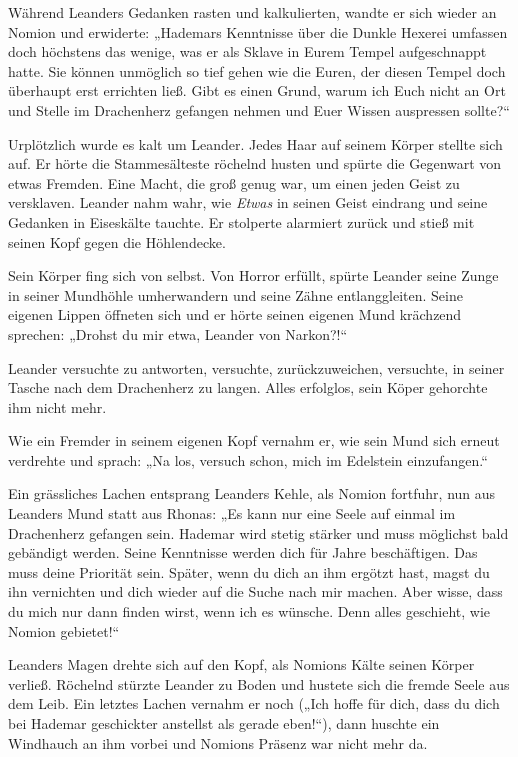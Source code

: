 \documentclass[10pt, a4paper, oneside]{book}
\begin{document}
Während Leanders Gedanken rasten und kalkulierten, wandte er sich wieder an Nomion und erwiderte: „Hademars Kenntnisse über die Dunkle Hexerei umfassen doch höchstens das wenige, was er als Sklave in Eurem Tempel aufgeschnappt hatte. Sie können unmöglich so tief gehen wie die Euren, der diesen Tempel doch überhaupt erst errichten ließ. Gibt es einen Grund, warum ich Euch nicht an Ort und Stelle im Drachenherz gefangen nehmen und Euer Wissen auspressen sollte?“

Urplötzlich wurde es kalt um Leander. Jedes Haar auf seinem Körper stellte sich auf. Er hörte die Stammesälteste röchelnd husten und spürte die Gegenwart von etwas Fremden. Eine Macht, die groß genug war, um einen jeden Geist zu versklaven. Leander nahm wahr, wie \textit{Etwas} in seinen Geist eindrang und seine Gedanken in Eiseskälte tauchte. Er stolperte alarmiert zurück und stieß mit seinen Kopf gegen die Höhlendecke.

Sein Körper fing sich von selbst. Von Horror erfüllt, spürte Leander seine Zunge in seiner Mundhöhle umherwandern und seine Zähne entlanggleiten. Seine eigenen Lippen öffneten sich und er hörte seinen eigenen Mund krächzend sprechen: „Drohst du mir etwa, Leander von Narkon?!“

Leander versuchte zu antworten, versuchte, zurückzuweichen, versuchte, in seiner Tasche nach dem Drachenherz zu langen. Alles erfolglos, sein Köper gehorchte ihm nicht mehr.

Wie ein Fremder in seinem eigenen Kopf vernahm er, wie sein Mund sich erneut verdrehte und sprach: „Na los, versuch schon, mich im Edelstein einzufangen.“

Ein grässliches Lachen entsprang Leanders Kehle, als Nomion fortfuhr, nun aus Leanders Mund statt aus Rhonas: „Es kann nur eine Seele auf einmal im Drachenherz gefangen sein. Hademar wird stetig stärker und muss möglichst bald gebändigt werden. Seine Kenntnisse werden dich für Jahre beschäftigen. Das muss deine Priorität sein. Später, wenn du dich an ihm ergötzt hast, magst du ihn vernichten und dich wieder auf die Suche nach mir machen. Aber wisse, dass du mich nur dann finden wirst, wenn ich es wünsche. Denn alles geschieht, wie Nomion gebietet!“

Leanders Magen drehte sich auf den Kopf, als Nomions Kälte seinen Körper verließ. Röchelnd stürzte Leander zu Boden und hustete sich die fremde Seele aus dem Leib. Ein letztes Lachen vernahm er noch („Ich hoffe für dich, dass du dich bei Hademar geschickter anstellst als gerade eben!“), dann huschte ein Windhauch an ihm vorbei und Nomions Präsenz war nicht mehr da.
\end{document}
